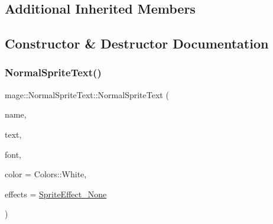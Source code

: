 \subsection*{Additional Inherited Members}


\subsection{Constructor \& Destructor Documentation}
\hypertarget{classmage_1_1_normal_sprite_text_a7945df1946a1aa4df8b534a812b420fe}{}\label{classmage_1_1_normal_sprite_text_a7945df1946a1aa4df8b534a812b420fe} 
\subsubsection{\texorpdfstring{Normal\+Sprite\+Text()}{NormalSpriteText()}\hspace{0.1cm}{\footnotesize\ttfamily [1/3]}}
{\footnotesize\ttfamily mage\+::\+Normal\+Sprite\+Text\+::\+Normal\+Sprite\+Text (\begin{DoxyParamCaption}\item[{const string \&}]{name,  }\item[{const wstring \&}]{text,  }\item[{\hyperlink{namespacemage_a1e01ae66713838a7a67d30e44c67703e}{Shared\+Ptr}$<$ \hyperlink{classmage_1_1_sprite_font}{Sprite\+Font} $>$}]{font,  }\item[{const X\+M\+V\+E\+C\+T\+OR \&}]{color = {\ttfamily Colors\+:\+:White},  }\item[{\hyperlink{namespacemage_a9cfe18123066ba4236f548f9de75d881}{Sprite\+Effect}}]{effects = {\ttfamily \hyperlink{namespacemage_a9cfe18123066ba4236f548f9de75d881af3c275fbfacfe174da928b2f24dfa515}{Sprite\+Effect\+\_\+\+None}} }\end{DoxyParamCaption})\hspace{0.3cm}{\ttfamily [explicit]}}

\hypertarget{classmage_1_1_normal_sprite_text_a3bd8f94a53caeb7ead9312da6b9b849a}{}\label{classmage_1_1_normal_sprite_text_a3bd8f94a53caeb7ead9312da6b9b849a} 
